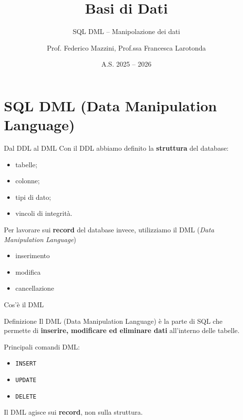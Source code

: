 \documentclass{beamer}
\title{Basi di Dati}
\subtitle{SQL DML -- Manipolazione dei dati}
\author{Prof. Federico Mazzini, Prof.ssa Francesca Larotonda}
\institute{I.I.S. Francesco Alberghetti}
\date{A.S. 2025 -- 2026}
\begin{document}
\begin{frame}
\titlepage
\end{frame}

\section{SQL DML (Data Manipulation Language)}

\begin{frame}{Dal DDL al DML}
Con il DDL abbiamo definito la \textbf{struttura} del database:
\begin{itemize}
    \item tabelle;
    \item colonne;
    \item tipi di dato;
    \item vincoli di integrità.
\end{itemize}

\medskip
Per lavorare sui \textbf{record} del database invece, utilizziamo il DML (\textit{Data Manipulation Language})
\begin{itemize}
    \item inserimento
    \item modifica
    \item cancellazione
\end{itemize}
\end{frame}

\begin{frame}{Cos'è il DML}
\begin{block}{Definizione}
Il DML (Data Manipulation Language) è la parte di SQL che permette di \textbf{inserire, modificare ed eliminare dati} all'interno delle tabelle.
\end{block}

\medskip
Principali comandi DML:
\begin{itemize}
    \item \texttt{INSERT}
    \item \texttt{UPDATE}
    \item \texttt{DELETE}
\end{itemize}

\medskip
Il DML agisce sui \textbf{record}, non sulla struttura.
\end{frame}
\end{document}
